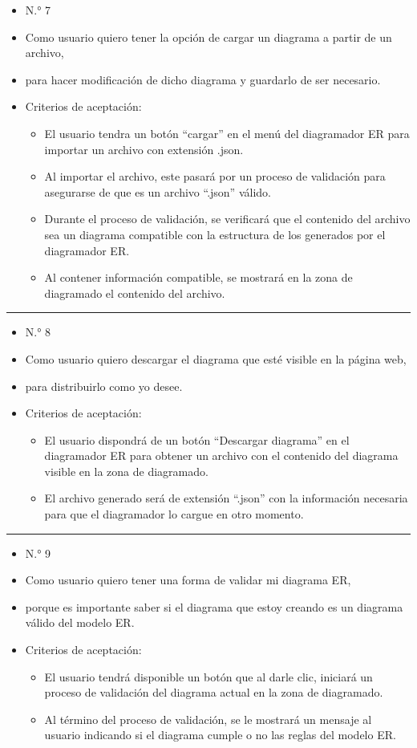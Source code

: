 \begin{itemize}
	\item N.° 7
	\item Como usuario quiero tener la opción de cargar un diagrama a partir de un archivo,
	\item para hacer modificación de dicho diagrama y guardarlo de ser necesario.
	\item Criterios de aceptación:
	\begin{itemize}
		\item El usuario tendra un botón ``cargar'' en el menú del diagramador ER para importar un archivo con extensión .json.
		\item Al importar el archivo, este pasará por un proceso de validación para asegurarse de que es un archivo ``.json'' válido.
		\item Durante el proceso de validación, se verificará que el contenido del archivo sea un diagrama compatible con la estructura de los generados por el diagramador ER.
		\item Al contener información compatible, se mostrará en la zona de diagramado el contenido del archivo.
	\end{itemize}
\end{itemize}
\noindent\rule{\textwidth}{1pt}
\begin{itemize}
	\item N.° 8
	\item Como usuario quiero descargar el diagrama que esté visible en la página web,
	\item para distribuirlo como yo desee.
	\item Criterios de aceptación:
	\begin{itemize}
		\item El usuario dispondrá de un botón ``Descargar diagrama'' en el diagramador ER para obtener un archivo con el contenido del diagrama visible en la zona de diagramado.
		\item El archivo generado será de extensión ``.json'' con la información necesaria para que el diagramador lo cargue en otro momento.
	\end{itemize}
\end{itemize}
\noindent\rule{\textwidth}{1pt}
\begin{itemize}
	\item N.° 9
	\item Como usuario quiero tener una forma de validar mi diagrama ER,
	\item porque es importante saber si el diagrama que estoy creando es un diagrama válido del modelo ER.
	\item Criterios de aceptación:
	\begin{itemize}
		\item El usuario tendrá disponible un botón que al darle clic, iniciará un proceso de validación del diagrama actual en la zona de diagramado.
		\item Al término del proceso de validación, se le mostrará un mensaje al usuario indicando si el diagrama cumple o no las reglas del modelo ER.
	\end{itemize}
\end{itemize}

